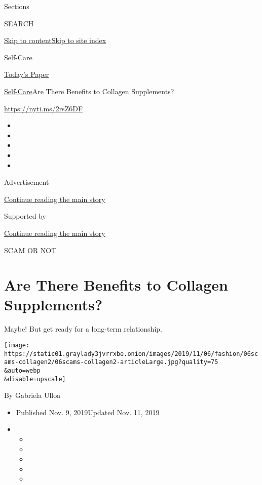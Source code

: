 Sections

SEARCH

\protect\hyperlink{site-content}{Skip to
content}\protect\hyperlink{site-index}{Skip to site index}

\href{https://www.nytimes3xbfgragh.onion/section/style/self-care/}{Self-Care}

\href{https://myaccount.nytimes3xbfgragh.onion/auth/login?response_type=cookie\&client_id=vi}{}

\href{https://www.nytimes3xbfgragh.onion/section/todayspaper}{Today's
Paper}

\href{/section/style/self-care/}{Self-Care}\textbar{}Are There Benefits
to Collagen Supplements?

\href{https://nyti.ms/2rsZ6DF}{https://nyti.ms/2rsZ6DF}

\begin{itemize}
\item
\item
\item
\item
\item
\end{itemize}

Advertisement

\protect\hyperlink{after-top}{Continue reading the main story}

Supported by

\protect\hyperlink{after-sponsor}{Continue reading the main story}

SCAM OR NOT

\hypertarget{are-there-benefits-to-collagen-supplements}{%
\section{Are There Benefits to Collagen
Supplements?}\label{are-there-benefits-to-collagen-supplements}}

Maybe! But get ready for a long-term relationship.

\texttt{[image: https://static01.graylady3jvrrxbe.onion/images/2019/11/06/fashion/06scams-collagen2/06scams-collagen2-articleLarge.jpg?quality=75\\\&auto=webp\\\&disable=upscale]}

By Gabriela Ulloa

\begin{itemize}
\item
  Published Nov. 9, 2019Updated Nov. 11, 2019
\item
  \begin{itemize}
  \item
  \item
  \item
  \item
  \item
  \end{itemize}
\end{itemize}

